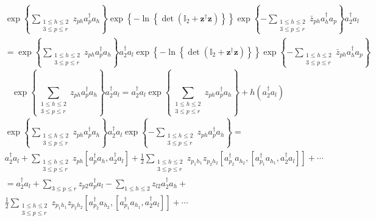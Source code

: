 \documentclass[aps,preprint]{revtex4}%
\begin{document}
\begin{align}
&  \exp\left\{  \sum\limits_{\substack{1\leq h\leq2\\3\leq p\leq r}%
}z_{ph}a_{p}^{\dagger}a_{h}\right\}  \exp\left\{  -\ln\left\{  \det\left(
\mathbb{I}_{2}+\mathbf{z}^{\dagger}\mathbf{z}\right)  \right\}  \right\}
\exp\left\{  -\sum\limits_{\substack{1\leq h\leq2\\3\leq p\leq r}}\bar{z}%
_{ph}a_{h}^{\dagger}a_{p}\right\}  a_{2}^{\dagger}a_{l}\\
&  =\exp\left\{  \sum\limits_{\substack{1\leq h\leq2\\3\leq p\leq r}%
}z_{ph}a_{p}^{\dagger}a_{h}\right\}  a_{2}^{\dagger}a_{l}\exp\left\{
-\ln\left\{  \det\left(  \mathbb{I}_{2}+\mathbf{z}^{\dagger}\mathbf{z}\right)
\right\}  \right\}  \exp\left\{  -\sum\limits_{\substack{1\leq h\leq2\\3\leq
p\leq r}}\bar{z}_{ph}a_{h}^{\dagger}a_{p}\right\}
\end{align}%
\begin{equation}
\exp\left\{  \sum\limits_{\substack{1\leq h\leq2\\3\leq p\leq r}}z_{ph}%
a_{p}^{\dagger}a_{h}\right\}  a_{2}^{\dagger}a_{l}=a_{2}^{\dagger}a_{l}%
\exp\left\{  \sum\limits_{\substack{1\leq h\leq2\\3\leq p\leq r}}z_{ph}%
a_{p}^{\dagger}a_{h}\right\}  +h\left(  a_{2}^{\dagger}a_{l}\right)
\end{equation}%
\begin{align}
&  \exp\left\{  \sum\limits_{\substack{1\leq h\leq2\\3\leq p\leq r}%
}z_{ph}a_{p}^{\dagger}a_{h}\right\}  a_{2}^{\dagger}a_{l}\exp\left\{
-\sum\limits_{\substack{1\leq h\leq2\\3\leq p\leq r}}z_{ph}a_{p}^{\dagger
}a_{h}\right\}  =\\
&  a_{2}^{\dagger}a_{l}+\sum\limits_{\substack{1\leq h\leq2\\3\leq p\leq
r}}z_{ph}\left[  a_{p}^{\dagger}a_{h},a_{2}^{\dagger}a_{l}\right]  +\frac
{1}{2}\sum\limits_{\substack{1\leq h\leq2\\3\leq p\leq r}}z_{p_{1}h_{1}%
}z_{p_{2}h_{2}}\left[  a_{p_{2}}^{\dagger}a_{h_{2}},\left[  a_{p_{1}}%
^{\dagger}a_{h_{1}},a_{2}^{\dagger}a_{l}\right]  \right]  +\cdots\\
&  =a_{2}^{\dagger}a_{l}+\sum\limits_{3\leq p\leq r}z_{p2}a_{p}^{\dagger}%
a_{l}-\sum\limits_{1\leq h\leq2}z_{l2}a_{2}^{\dagger}a_{h}+\\
&  \frac{1}{2}\sum\limits_{\substack{1\leq h\leq2\\3\leq p\leq r}%
}z_{p_{1}h_{1}}z_{p_{2}h_{2}}\left[  a_{p_{2}}^{\dagger}a_{h_{2}},\left[
a_{p_{1}}^{\dagger}a_{h_{1}},a_{2}^{\dagger}a_{l}\right]  \right]  +\cdots
\end{align}
\end{document}
